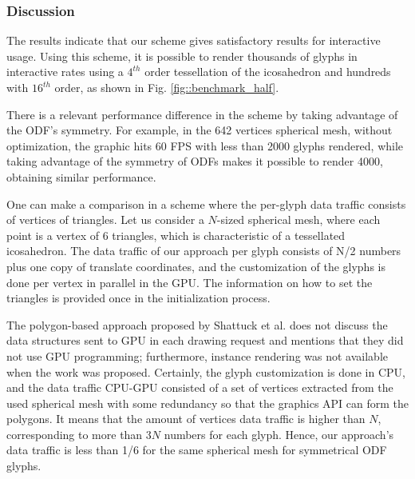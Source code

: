 \documentclass[twoside,twocolumn,10pt]{article}
\begin{document}
\subsubsection{Discussion}

The results indicate that our scheme gives satisfactory results for interactive usage. Using this scheme, it is possible to render thousands of glyphs in interactive rates using a $4^{th}$ order tessellation of the icosahedron and hundreds with $16^{th}$ order, as shown in Fig. \ref{fig::benchmark_half}.

There is a relevant performance difference in the scheme by taking advantage of the ODF's symmetry. For example, in the 642 vertices spherical mesh, without optimization, the graphic hits 60 FPS with less than 2000 glyphs rendered, while taking advantage of the symmetry of ODFs makes it possible to render 4000, obtaining similar performance.

One can make a comparison in a scheme where the per-glyph data traffic consists of vertices of triangles. Let us consider a $N$-sized spherical mesh, where each point is a vertex of 6 triangles, which is characteristic of a tessellated icosahedron. The data traffic of our approach per glyph consists of N/2 numbers plus one copy of translate coordinates, and the customization of the glyphs is done per vertex in parallel in the GPU. The information on how to set the triangles is provided once in the initialization process.

The polygon-based approach proposed by Shattuck et al. \cite{shattuck2008} does not discuss the data structures sent to GPU in each drawing request and mentions that they did not use GPU programming; furthermore, instance rendering was not available when the work was proposed. Certainly, the glyph customization is done in CPU, and the data traffic CPU-GPU consisted of a set of vertices extracted from the used spherical mesh with some redundancy so that the graphics API can form the polygons. It means that the amount of vertices data traffic is higher than $N$, corresponding to more than $3N$ numbers for each glyph. Hence, our approach's data traffic is less than 1/6 for the same spherical mesh for symmetrical ODF glyphs.

\end{document}

